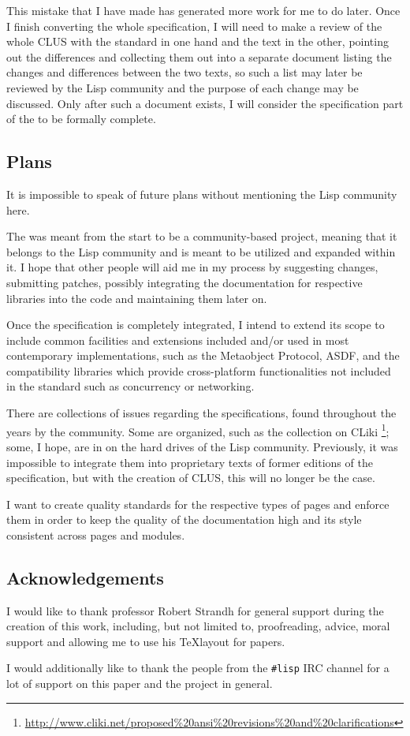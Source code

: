 This mistake that I have made has generated more work for me to do later. Once I finish converting the whole specification, I will need to make a review of the whole CLUS with the standard in one hand and the \us{} text in the other, pointing out the differences and collecting them out into a separate document listing the changes and differences between the two texts, so such a list may later be reviewed by the Lisp community and the purpose of each change may be discussed. Only after such a document exists, I will consider the specification part of the \us{} to be formally complete.

\subsection{Plans}

It is impossible to speak of future plans without mentioning the Lisp community here.

The \cl{} \us{} was meant from the start to be a community-based project, meaning that it belongs to the Lisp community and is meant to be utilized and expanded within it. I hope that other people will aid me in my process by suggesting changes, submitting patches, possibly integrating the documentation for respective \cl{} libraries into the code and maintaining them later on.

Once the specification is completely integrated, I intend to extend its scope to include common facilities and extensions included and/or used in most contemporary \cl{} implementations, such as the Metaobject Protocol, ASDF, \ql{} and the compatibility libraries which provide cross-platform functionalities not included in the standard such as concurrency or networking.

There are collections of issues regarding the specifications, found throughout the years by the community. Some are organized, such as the collection on CLiki \footnote{\url{http://www.cliki.net/proposed\%20ansi\%20revisions\%20and\%20clarifications}}; some, I hope, are in on the hard drives of the Lisp community. Previously, it was impossible to integrate them into proprietary texts of former editions of the specification, but with the creation of CLUS, this will no longer be the case.

I want to create quality standards for the respective types of pages and enforce them in order to keep the quality of the documentation high and its style consistent across pages and modules.

\subsection{Acknowledgements}

I would like to thank professor Robert Strandh for general support during the creation of this work, including, but not limited to, proofreading, advice, moral support and allowing me to use his \TeX layout for papers.

I would additionally like to thank the people from the \texttt{\#lisp} IRC channel for a lot of support on this paper and the \cl{} \us{} project in general.
